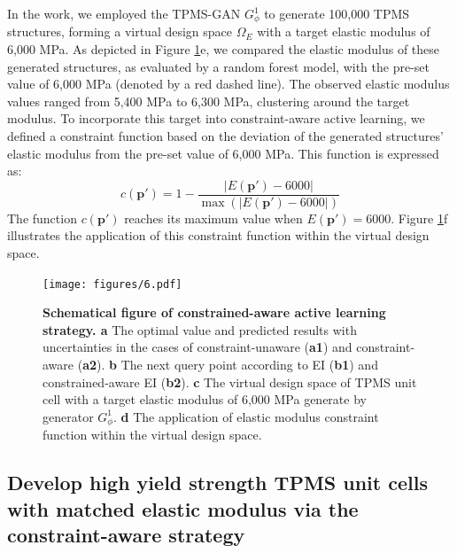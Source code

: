 \documentclass[preprint,review,12pt,authoryear]{elsarticle}
\begin{document}
In  the work, we employed the TPMS-GAN $G_\phi^1$ to generate 100,000 TPMS structures, forming a virtual design space $\Omega_E$ with a target elastic modulus of 6,000 MPa. As depicted in Figure \ref{fig:6}e, we compared the elastic modulus of these generated structures, as evaluated by a random forest model, with the pre-set value of 6,000 MPa (denoted by a red dashed line). The observed elastic modulus values ranged from 5,400 MPa to 6,300 MPa, clustering around the target modulus. To incorporate this target into constraint-aware active learning, we defined a constraint function based on the deviation of the generated structures' elastic modulus from the pre-set value of 6,000 MPa. This function is expressed as:
\begin{equation}
    c(\boldsymbol{p}') = 1 - \frac{|E(\boldsymbol{p}') - 6000|}{\max(|E(\boldsymbol{p}') - 6000|)}
\label{eq:22}
\end{equation}
The function $c(\boldsymbol{p}')$ reaches its maximum value when $E(\boldsymbol{p}') = 6000$. Figure \ref{fig:6}f illustrates the application of this constraint function within the virtual design space.

\begin{figure}
    \centering
    \texttt{[image: figures/6.pdf]}
    \caption{\textbf{Schematical figure of constrained-aware active learning strategy. a} The optimal value and predicted results with uncertainties in the cases of constraint-unaware (\textbf{a1}) and constraint-aware (\textbf{a2}). \textbf{b} The next query point according to EI (\textbf{b1}) and constrained-aware EI (\textbf{b2}). \textbf{c} The virtual design space of TPMS unit cell with a target elastic modulus of 6,000 MPa generate by generator $G_\phi^1$. \textbf{d} The application of elastic modulus constraint function within the virtual design space.}
    \label{fig:6}
\end{figure}

\subsection{Develop high yield strength TPMS unit cells with matched elastic modulus via the constraint-aware strategy}
\end{document}
